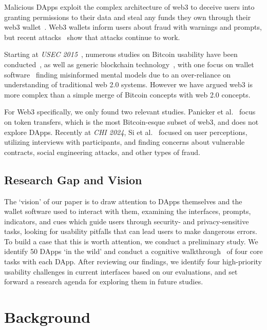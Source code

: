 \documentclass[conference]{IEEEtran}
\begin{document}
Malicious DApps exploit the complex architecture of web3 to deceive users into granting permissions to their data and steal any funds they own through their web3 wallet~\cite{si2024understanding,torres2023your}.
Web3 wallets inform users about fraud with warnings and prompts, but recent attacks~\cite{toulas2024lottiefiles,vismaya2024pepe,zmudzinski2024Eigenlayer} show that attacks continue to work.

Starting at \textit{USEC 2015}~\cite{eskandari2018first}, numerous studies on Bitcoin usability have been conducted~\cite{eskandari2018first,gao2016of,krombholz2017the,mai2020user,sas2017design}, as well as generic blockchain technology~\cite{frohlich2022blockchain,jang2022userExperience,jang2020userPerspectives}, with one focus on wallet software~\cite{voskobojnikov2021u} finding misinformed mental models due to an over-reliance on understanding of traditional web 2.0 systems. However we have argued web3 is more complex than a simple merge of Bitcoin concepts with web 2.0 concepts.

For Web3 specifically, we only found two relevant studies. Panicker et al.~\cite{panicker2024end} focus on token transfers, which is the most Bitcoin-esque subset of web3, and does not explore DApps. Recently at \textit{CHI 2024}, Si et al.~\cite{si2024understanding} focused on user perceptions, utilizing interviews with participants, and finding concerns about vulnerable contracts, social engineering attacks, and other types of fraud.

\subsection{Research Gap and Vision}

The `vision' of our paper is to draw attention to DApps themselves and the wallet software used to interact with them, examining the interfaces, prompts, indicators, and cues which guide users through security- and privacy-sensitive tasks, looking for usability pitfalls that can lead users to make dangerous errors. To build a case that this is worth attention, we conduct a preliminary study. We identify 50 DApps `in the wild' and conduct a cognitive walkthrough~\cite{wharton1994cognitive} of four core tasks with each DApp. After reviewing our findings, we identify four high-priority usability challenges in current interfaces based on our evaluations, and set forward a research agenda for exploring them in future studies. 

\section{Background}
\end{document}
